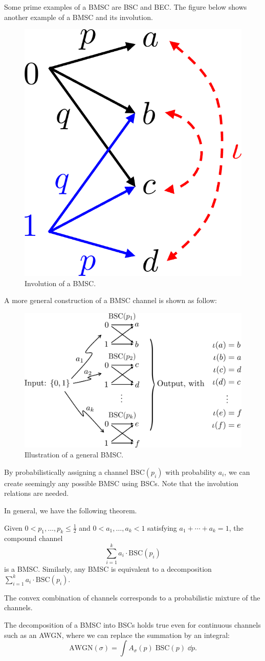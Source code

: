 Some prime examples of a BMSC are BSC and BEC. The figure below shows another example of a BMSC and its involution.
\begin{figure}[H]
    \centering
    \includegraphics[width=0.2\linewidth]{figures/w3_BMSC.png}
    \caption{Involution of a BMSC.}
\end{figure}
A more general construction of a BMSC channel is shown as follow:
\begin{figure}[H]
    \centering
    \includegraphics[width=0.7\linewidth]{figures/w3_construct_BMSC.png}
    \caption{Illustration of a general BMSC.}
\end{figure}
By probabilistically assigning a channel $\mathrm{BSC}(p_i)$ with probability $a_i$, we can create seemingly any possible BMSC using BSCs. Note that the involution relations are needed.


In general, we have the following theorem.
\begin{theorem}
    Given $0<p_1,\ldots,p_k\le\frac{1}{2}$ and $0<a_1,\ldots,a_k<1$ satisfying $a_1+\cdots+a_k=1$, the compound channel
    \begin{equation}
        \sum_{i=1}^k a_i\cdot\mathrm{BSC}(p_i)
    \end{equation}
    is a BMSC. Similarly, any BMSC is equivalent to a decomposition $\sum_{i=1}^k a_i\cdot\mathrm{BSC}(p_i)$.
\end{theorem}
The convex combination of channels corresponds to a probabilistic mixture of the channels.

\begin{remark}
    The decomposition of a BMSC into BSCs holds true even for continuous channels such as an AWGN, where we can replace the summation by an integral:
    \begin{equation*}
        \mathrm{AWGN}(\sigma) = \int A_\sigma(p)\; \mathrm{BSC}(p)\;\dd p.
    \end{equation*}
\end{remark}

